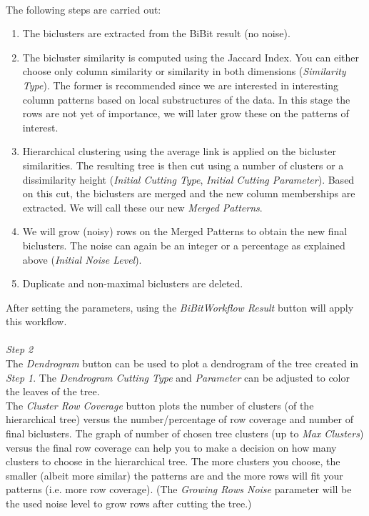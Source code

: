 \documentclass[a4paper]{article}\usepackage[]{graphicx}\usepackage[]{color}
\begin{document}
\\
The following steps are carried out:
\begin{enumerate}
\item The biclusters are extracted from the BiBit result (no noise).
\item The bicluster similarity is computed using the Jaccard Index. You can either choose only column similarity or similarity in both dimensions ({\it Similarity Type}). The former is recommended since we are interested in interesting column patterns based on local substructures of the data. In this stage the rows are not yet of importance, we will later grow these on the patterns of interest.
\item Hierarchical clustering using the average link is applied on the bicluster similarities. The resulting tree is then cut using a number of clusters or a dissimilarity height ({\it Initial Cutting Type}, {\it Initial Cutting Parameter}). Based on this cut, the biclusters are merged and the new column memberships are extracted. We will call these our new {\it Merged Patterns}.
\item We will grow (noisy) rows on the Merged Patterns to obtain the new final biclusters. The noise can again be an integer or a percentage as explained above ({\it Initial Noise Level}).
\item Duplicate and non-maximal biclusters are deleted.
\end{enumerate}
After setting the parameters, using the {\it BiBitWorkflow Result} button will apply this workflow.
\\ \\
{\it Step 2}\\
The {\it Dendrogram} button can be used to plot a dendrogram of the tree created in {\it Step 1}. The {\it Dendrogram Cutting Type} and {\it Parameter} can be adjusted to color the leaves of the tree.\\
The {\it Cluster Row Coverage} button plots the number of clusters (of the hierarchical tree) versus the number/percentage of row coverage and number of final biclusters. The graph of number of chosen tree clusters (up to {\it Max Clusters}) versus the final row coverage can help you to make a decision on how many clusters to choose in the hierarchical tree. The more clusters you choose, the smaller (albeit more similar) the patterns are and the more rows will fit your patterns (i.e. more row coverage). (The {\it Growing Rows Noise} parameter will be the used noise level to grow rows after cutting the tree.)
\end{document}

